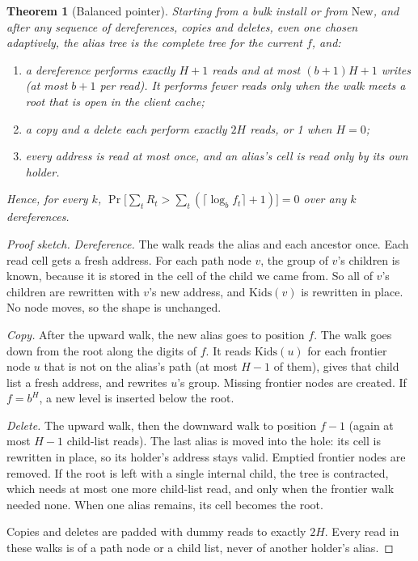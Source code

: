 \documentclass[11pt]{article}
\newtheorem{theorem}{Theorem}
\theoremstyle{definition}
\begin{document}
\begin{theorem}[Balanced pointer]\label{thm:balanced}
Starting from a bulk install or from $\mathrm{New}$, and after any sequence
of dereferences, copies and deletes, even one chosen adaptively, the alias
tree is the complete tree for the current $f$, and:
\begin{enumerate}
\item a dereference performs exactly $H+1$ reads and at most $(b+1)H+1$
  writes (at most $b+1$ per read). It performs fewer reads only when the walk
  meets a root that is open in the client cache;
\item a copy and a delete each perform exactly $2H$ reads, or 1 when $H=0$;
\item every address is read at most once, and an alias's cell is read only by
  its own holder.
\end{enumerate}
Hence, for every $k$, $\Pr\big[\sum_t R_t>\sum_t(\lceil\log_b
f_t\rceil+1)\big]=0$ over any $k$ dereferences.
\end{theorem}
\begin{proof}[Proof sketch]
\emph{Dereference.} The walk reads the alias and each ancestor once. Each read
cell gets a fresh address. For each path node $v$, the group of $v$'s
children is known, because it is stored in the cell of the child we came
from. So all of $v$'s children are rewritten with $v$'s new address, and
$\mathrm{Kids}(v)$ is rewritten in place. No node moves, so the shape is
unchanged.

\emph{Copy.} After the upward walk, the new alias goes to position $f$. The
walk goes down from the root along the digits of $f$. It reads
$\mathrm{Kids}(u)$ for each frontier node $u$ that is not on the alias's path
(at most $H-1$ of them), gives that child list a fresh address, and rewrites
$u$'s group. Missing frontier nodes are created. If $f=b^H$, a new level is
inserted below the root.

\emph{Delete.} The upward walk, then the downward walk to position $f-1$
(again at most $H-1$ child-list reads). The last alias is moved into the
hole: its cell is rewritten in place, so its holder's address stays valid.
Emptied frontier nodes are removed. If the root is left with a single
internal child, the tree is contracted, which needs at most one more
child-list read, and only when the frontier walk needed none. When one alias
remains, its cell becomes the root.

Copies and deletes are padded with dummy reads to exactly $2H$. Every read in
these walks is of a path node or a child list, never of another holder's
alias.
\end{proof}
\end{document}
